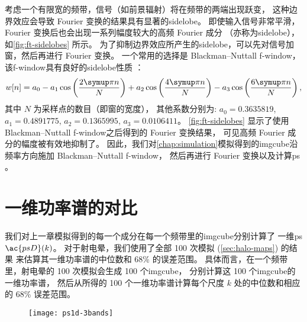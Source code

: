 考虑一个有限宽的频带，信号（如前景辐射）将在频带的两端出现跃变，
这种边界效应会导致 Fourier 变换的结果具有显著的\ac{sidelobe}。
即使输入信号非常平滑，Fourier 变换后也会出现一系列幅度较大的高频 Fourier 成分
（亦称为\ac{sidelobe}），如\autoref{fig:ft-sidelobes} 所示。
为了抑制边界效应所产生的\ac{sidelobe}，可以先对信号加窗，然后再进行 Fourier 变换。
一个常用的选择是 Blackman--Nuttall \ac{f-window}，
该\ac{f-window}具有良好的\ac{sidelobe}性质 \cite{nuttall1981}：
\begin{equation}
  \label{eq:bn-window}
  w[n] = a_0 - a_1 \cos\left(\frac{2\Cpi n}{N}\right)
    + a_2 \cos\left(\frac{4\Cpi n}{N}\right)
    - a_3 \cos\left(\frac{6\Cpi n}{N}\right) ,
\end{equation}
其中
$N$ 为采样点的数目（即窗的宽度），
其他系数分别为:
$a_0 = \num{0.3635819}$,
$a_1 = \num{0.4891775}$,
$a_2 = \num{0.1365995}$,
$a_3 = \num{0.0106411}$。
\autoref{fig:ft-sidelobes} 显示了使用 Blackman--Nuttall
\ac{f-window}之后得到的 Fourier 变换结果，
可见高频 Fourier 成分的幅度被有效地抑制了。
因此，我们对\autoref{chap:simulation}模拟得到的\ac{imgcube}沿频率方向施加
Blackman--Nuttall \ac{f-window}，
然后再进行 Fourier 变换以及计算\ac{ps} \cite{trott2015,chapman2016}。


\section{一维功率谱的对比}
\label{sec:ps1d}

我们对上一章模拟得到的每一个成分在每一个频带里的\ac{imgcube}分别计算了
一维\ac{ps} $\ac{psD}(k)$。
对于射电晕，我们使用了全部 100 次模拟 (\autoref{sec:halo-maps}) 的结果
来估算其一维功率谱的中位数和 68\% 的误差范围。
具体而言，在一个频带里，射电晕的 100 次模拟会生成 100 个\ac{imgcube}，
分别计算这 100 个\ac{imgcube}的一维功率谱，
然后从所得的 100 个一维功率谱计算每个尺度 $k$ 处的中位数和相应的 68\% 误差范围。

\begin{figure}[htp]
  \centering
  \texttt{[image: ps1d-3bands]}
  \label{fig:ps1d-3bands}
\end{figure}

